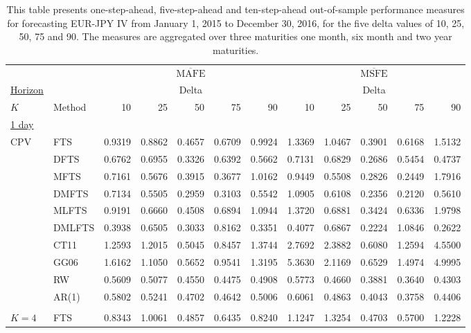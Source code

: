 \documentclass[12pt,a4paper]{article}
\begin{document}
\begin{center}
\tabcolsep 0.08in
\renewcommand{\arraystretch}{0.95}
\begin{small}
\begin{longtable}{@{}llrrrrrrrrrr@{}}
\caption{\small{This table presents one-step-ahead, five-step-ahead and ten-step-ahead out-of-sample performance measures for forecasting EUR-JPY IV from January 1, 2015 to December 30, 2016, for the five delta values of 10, 25, 50, 75 and 90. The measures are aggregated over three maturities one month, six month and two year maturities.}}\label{tab:6_moneyness} \\
\toprule
& & \multicolumn{5}{c}{$\overline{\text{MAFE}}$} & \multicolumn{5}{c}{$\overline{\text{MSFE}}$} \\
\underline{Horizon} & & \multicolumn{5}{c}{Delta} & \multicolumn{5}{c}{Delta} \\
$K$ & Method & 10 & 25 & 50 & 75 & 90 & 10 & 25 & 50 & 75 & 90 \\ 
\endfirsthead
\midrule
\underline{1 day} \\
CPV &  FTS & 0.9319 & 0.8862 & 0.4657 & 0.6709 & 0.9924 & 1.3369 & 1.0467 & 0.3901 & 0.6168 & 1.5132 \\ 
  & DFTS & 0.6762 & 0.6955 & 0.3326 & 0.6392 & 0.5662 & 0.7131 & 0.6829 & 0.2686 & 0.5454 & 0.4737 \\ 
  & MFTS & 0.7161 & 0.5676 & 0.3915 & 0.3677 & 1.0162 & 0.9449 & 0.5508 & 0.2826 & 0.2449 & 1.7916 \\ 
  & DMFTS & 0.7134 & 0.5505 & 0.2959 & 0.3103 & 0.5542 & 1.0905 & 0.6108 & 0.2356 & 0.2120 & 0.5610 \\ 
  & MLFTS & 0.9191 & 0.6660 & 0.4508 & 0.6894 & 1.0944 & 1.3720 & 0.6881 & 0.3424 & 0.6336 & 1.9798 \\ 
  & DMLFTS & 0.3938 & 0.6505 & 0.3033 & 0.8162 & 0.3351 & 0.4077 & 0.6867 & 0.2224 & 1.0846 & 0.2622 \\ 
  & CT11 & 1.2593 & 1.2015 & 0.5045 & 0.8457 & 1.3744 & 2.7692 & 2.3882 & 0.6080 & 1.2594 & 4.5500 \\ 
  & GG06 & 1.6162 & 1.1050 & 0.5652 & 0.9541 & 1.3195 & 5.3630 & 2.1169 & 0.6529 & 1.4974 & 4.9995 \\ 
  & RW & 0.5609 & 0.5077 & 0.4550 & 0.4475 & 0.4908 & 0.5773 & 0.4660 & 0.3881 & 0.3640 & 0.4303 \\ 
  & AR(1) & 0.5802 & 0.5241 & 0.4702 & 0.4642 & 0.5006 & 0.6061 & 0.4863 & 0.4043 & 0.3758 & 0.4406 \\ 
\\
$K=4$ & FTS & 0.8343 & 1.0061 & 0.4857 & 0.6435 & 0.8240 & 1.1247 & 1.3254 & 0.4703 & 0.5700 & 1.2228 \\ 

\end{longtable}
\end{small}
\end{center}
\end{document}

